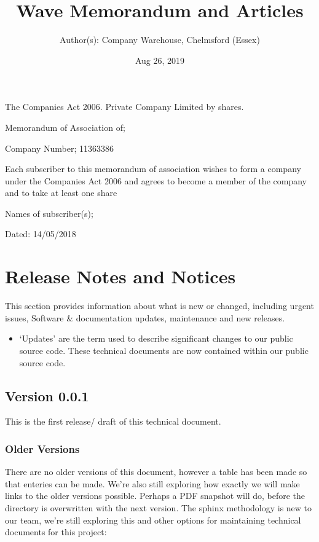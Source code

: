 \documentclass[letterpaper,10pt,openany,oneside,english]{sphinxmanual}
\title{Wave Memorandum and Articles}
\date{Aug 26, 2019}
\author{Author(s): Company Warehouse, Chelmsford (Essex)}
\begin{document}
\maketitle
\sphinxtableofcontents
{}\label{\detokenize{index::doc}}


The Companies Act 2006. Private Company Limited by shares.

Memorandum of Association of; 

Company Number; 11363386

Each subscriber to this memorandum of association wishes to form a company under the Companies Act 2006 and agrees to become a member of the company and to take at least one share

Names of subscriber(s); 

Dated: 14/05/2018


\chapter{Release Notes and Notices}
\label{\detokenize{releasenotes:release-notes-and-notices}}\label{\detokenize{releasenotes::doc}}
This section provides information about what is new or changed, including urgent issues, Software \& documentation updates, maintenance and new releases.
\begin{itemize}
\item {} 
‘Updates’ are the term used to describe significant changes to our public source code. These technical documents are now contained within our public source code.

\end{itemize}


\section{Version 0.0.1}
\label{\detokenize{releasenotes:version-0-0-1}}
This is the first release/ draft of this technical document.


\subsection{Older Versions}
\label{\detokenize{releasenotes:older-versions}}
There are no older versions of this document, however a table has been made so that enteries can be made. We’re also still exploring how exactly we will make links to the older versions possible. Perhaps a PDF snapshot will do, before the directory is overwritten with the next version. The sphinx methodology is new to our team, we’re still exploring this and other options for maintaining technical documents for this project:
\end{document}
